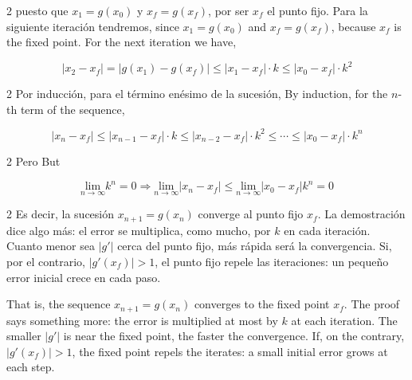 \begin{paracol}{2}
puesto que $x_1=g(x_0)$ y $x_f = g(x_f)$, por ser $x_f$ el punto fijo. Para la siguiente iteración tendremos,
\switchcolumn
since $x_1=g(x_0)$ and $x_f = g(x_f)$, because $x_f$ is the fixed point. For the next iteration we have,
\end{paracol}
\begin{equation*}
\vert x_2-x_f \vert = \vert g(x_1)-g(x_f) \vert \leq \vert x_1-x_f \vert \cdot k \leq \vert x_0-x_f \vert \cdot k^2
\end{equation*}

\begin{paracol}{2}
Por inducción, para el término enésimo de la sucesión,
\switchcolumn
By induction, for the $n$-th term of the sequence,
\end{paracol}
\begin{equation*}
\vert x_n-x_f \vert \leq \vert x_{n-1}-x_f \vert \cdot k \leq \vert x_{n-2}-x_f \vert \cdot k^2 \leq \cdots \leq  \vert x_0-x_f \vert \cdot k^n
\end{equation*}

\begin{paracol}{2}
Pero
\switchcolumn
But
\end{paracol}

\begin{equation*}
\underset{n\rightarrow \infty}{\text{lim}}k^n=0 \Rightarrow \underset{n\rightarrow \infty}{\text{lim}} \vert x_n-x_f \vert \leq \underset{n\rightarrow \infty}{\text{lim}}\vert x_0-x_f \vert k^n =0
\end{equation*}

\begin{paracol}{2}
Es decir, la sucesión $x_{n+1}=g(x_n)$ converge al punto fijo $x_f$. La demostración dice algo más: el error se multiplica, como mucho, por $k$ en cada iteración. Cuanto menor sea $\vert g'\vert$ cerca del punto fijo, más rápida será la convergencia. Si, por el contrario, $\vert g'(x_f)\vert>1$, el punto fijo repele las iteraciones: un pequeño error inicial crece en cada paso.

\switchcolumn
That is, the sequence $x_{n+1}=g(x_n)$ converges to the fixed point $x_f$. The proof says something more: the error is multiplied at most by $k$ at each iteration. The smaller $\vert g'\vert$ is near the fixed point, the faster the convergence. If, on the contrary, $\vert g'(x_f)\vert>1$, the fixed point repels the iterates: a small initial error grows at each step.
\end{paracol}

